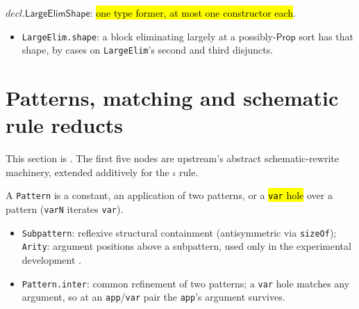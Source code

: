 \begin{definition}
\label{def:ind-large-elim-shape}
\leanok
{} 

 $decl.\mathsf{LargeElimShape}$: \hl{one type former, at most one constructor
each}.
\begin{itemize}
\item \texttt{LargeElim.shape}: a block eliminating largely at a possibly-$\mathsf{Prop}$
sort has that shape, by cases on \texttt{LargeElim}'s second and third disjuncts.
\end{itemize}
\end{definition}

\section{Patterns, matching and schematic rule reducts}

This section is . The first five nodes are
upstream's abstract schematic-rewrite machinery, extended additively for the $\iota$ rule.

\begin{definition}
\label{inductive:pattern-core}
\leanok
{}
 A \texttt{Pattern} is a constant, an application of two patterns, or a
\hl{\texttt{var} hole} over a pattern (\texttt{varN} iterates \texttt{var}).
\begin{itemize}
\item \texttt{Subpattern}: reflexive structural containment (antisymmetric via
\texttt{sizeOf}); \texttt{Arity}: argument positions above a subpattern, used only in the
experimental development 
.
\item \texttt{Pattern.inter}: common refinement of two patterns; a \texttt{var} hole matches
any argument, so at an \texttt{app}/\texttt{var} pair the \texttt{app}'s argument survives.
\end{itemize}
\end{definition}

